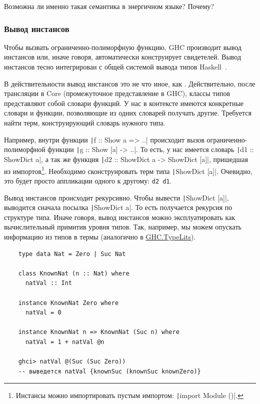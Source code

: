 \begin{task}
    Возможна ли именно такая семантика в энергичном языке?
    Почему?
\end{task}

\subsubsection{Вывод инстансов}

Чтобы вызвать ограниченно-полиморфную функцию, GHC производит вывод инстансов или, иначе говоря, автоматически конструирует свидетелей.
Вывод инстансов тесно интегрирован с общей системой вывода типов Haskell~\cite{spj-type-inference}.

В действительности вывод инстансов это не что иное, как .
Действительно, после трансляции в Core (промежуточное представление в GHC), классы типов представляют собой словари функций.
У нас в контексте имеются конкретные словари и функции, позволяющие из одних словарей получать другие.
Требуется найти терм, конструирующий словарь нужного типа.

Например, внутри функции \texttt|f :: Show a => ..| происходит вызов ограниченно-полиморфной функции
\texttt|g :: Show [a] -> ..|.
То есть, у нас имеется словарь \texttt|d1 :: ShowDict a|, а так же функция \texttt|d2 :: ShowDict a -> ShowDict [a]|, пришедшая из импортов\footnote{Инстансы можно импортировать пустым импортом: \texttt|import Module ()|.}.
Необходимо сконструировать терм типа \texttt|ShowDict [a]|.
Очевидно, это будет просто аппликации одного к другому: \texttt{d2 d1}.

Вывод инстансов происходит рекурсивно.
Чтобы вывести \texttt|ShowDict [a]|, выводится сначала посылка \texttt|ShowDict a|.
То есть получается рекурсия по структуре типа.
Иначе говоря, вывод инстансов можно эксплуатировать как вычислительный примитив уровня типов.
Так, например, мы можем опускать информацию из типов в термы (аналогично в \href{https://hackage.haskell.org/package/base-4.20.0.1/docs/GHC-TypeLits.html}{GHC.TypeLits}).
\begin{verbatim}
    type data Nat = Zero | Suc Nat

    class KnownNat (n :: Nat) where
      natVal :: Int

    instance KnownNat Zero where
      natVal = 0

    instance KnownNat n => KnownNat (Suc n) where
      natVal = 1 + natVal @n

    ghci> natVal @(Suc (Suc Zero))
    -- выведется natVal {knownSuc (knownSuc knownZero)}
\end{verbatim}

